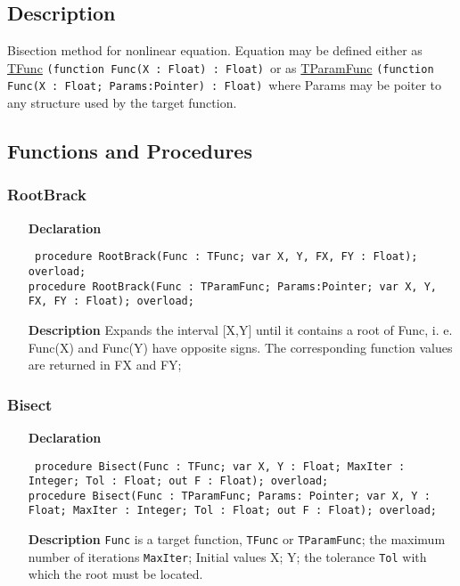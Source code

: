 \documentclass[12pt,a4paper,oneside]{report}
\newcommand{\declarationitem}[1]{\textbf{#1}}
\newcommand{\descriptiontitle}[1]{\textbf{#1}}
\newcommand{\code}[1]{\texttt{#1}}
\begin{document}
\subsection{Description}
Bisection method for nonlinear equation. Equation may be defined either as \hyperref[utypes-TFunc]{TFunc} \code{(function Func(X : Float) : Float)}\ or as \hyperref[utypes-TParamFunc]{TParamFunc} \code{(function Func(X : Float; Params:Pointer) : Float)}\ where Params may be poiter to any structure used by the target function.  
\subsection{Functions and Procedures}
\subsubsection{RootBrack}
\label{ubisect-RootBrack}
\begin{itemize}\item[\declarationitem{Declaration}\hfill]
	\begin{flushleft}
		\code{
			procedure RootBrack(Func : TFunc; var X, Y, FX, FY : Float); overload;\\
			procedure RootBrack(Func : TParamFunc; Params:Pointer; var X, Y, FX, FY : Float); overload;}
	\end{flushleft}
	\item[\descriptiontitle{Description}]
	Expands the interval [X,Y] until it contains a root of Func, i. e. Func(X) and Func(Y) have opposite signs. The corresponding function values are returned in FX and FY;
\end{itemize}
\subsubsection{Bisect}
\label{ubisect-Bisect}
\begin{itemize}\item[\declarationitem{Declaration}\hfill]
	\begin{flushleft}
		\code{
			procedure Bisect(Func : TFunc; var X, Y : Float; MaxIter : Integer; Tol : Float; out F : Float); overload;\\
			procedure Bisect(Func : TParamFunc; Params: Pointer; var X, Y : Float; MaxIter : Integer; Tol : Float; out F : Float); overload;}
	\end{flushleft}
	\item[\descriptiontitle{Description}]
	\code{Func} is a target function, \code{TFunc} or \code{TParamFunc}; the maximum number of iterations \code{MaxIter}; Initial values X; Y;  the tolerance \code{Tol} with which the root must be located.
\end{itemize}
\end{document}
